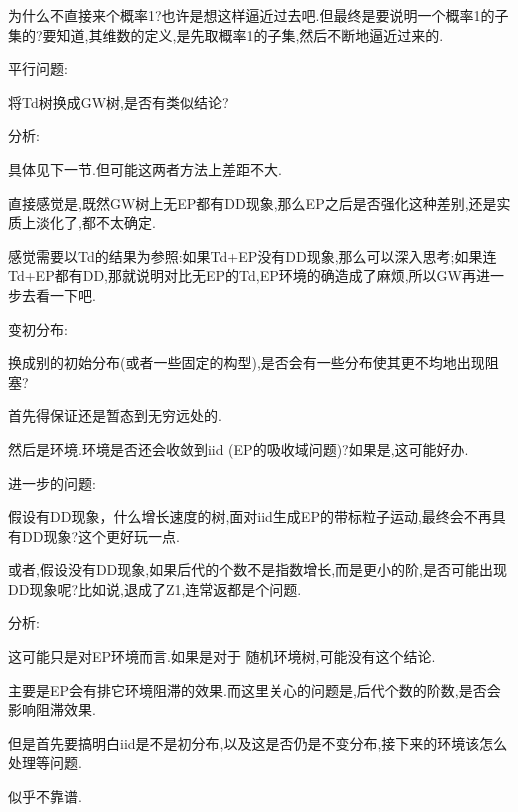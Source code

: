 \documentclass[a4paper,oneside]{ctexbook}
\begin{document}
							为什么不直接来个概率1?也许是想这样逼近过去吧.但最终是要说明一个概率1的子集的?要知道,其维数的定义,是先取概率1的子集,然后不断地逼近过来的.	

				平行问题:

					\begin{que}

						将Td树换成GW树,是否有类似结论?
					
					\end{que}

					分析:

						具体见下一节.但可能这两者方法上差距不大.

						直接感觉是,既然GW树上无EP都有DD现象,那么EP之后是否强化这种差别,还是实质上淡化了,都不太确定.

						感觉需要以Td的结果为参照:如果Td+EP没有DD现象,那么可以深入思考;如果连Td+EP都有DD,那就说明对比无EP的Td,EP环境的确造成了麻烦,所以GW再进一步去看一下吧.

				变初分布:

					\begin{que}

						换成别的初始分布(或者一些固定的构型),是否会有一些分布使其更不均地出现阻塞?
					
					\end{que}

					首先得保证还是暂态到无穷远处的.

					然后是环境.环境是否还会收敛到iid (EP的吸收域问题)?如果是,这可能好办.


				进一步的问题:

					\begin{que}[更多或更少的后代是否抵消或产生DD现象]

						假设有DD现象，什么增长速度的树,面对iid生成EP的带标粒子运动,最终会不再具有DD现象?这个更好玩一点.

						或者,假设没有DD现象,如果后代的个数不是指数增长,而是更小的阶,是否可能出现DD现象呢?比如说,退成了Z1,连常返都是个问题.
					
					\end{que}

					分析:

						这可能只是对EP环境而言.如果是对于 随机环境树,可能没有这个结论.

							主要是EP会有排它环境阻滞的效果.而这里关心的问题是,后代个数的阶数,是否会影响阻滞效果.

							但是首先要搞明白iid是不是初分布,以及这是否仍是不变分布,接下来的环境该怎么处理等问题.

						似乎不靠谱.
\end{document}
